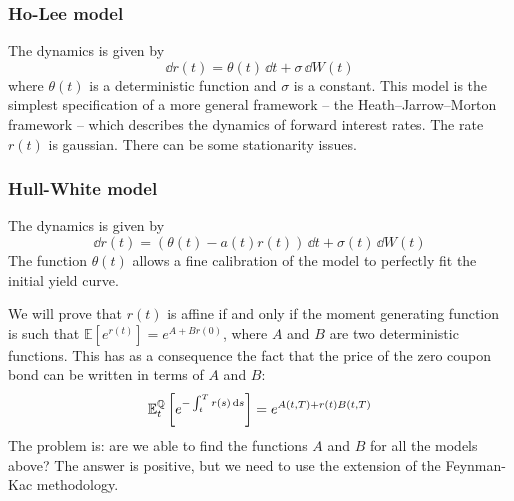 \subsubsection{Ho-Lee model}
The dynamics is given by
\begin{equation}
    \dd r(t) = \theta(t)\,\dd t + \sigma\,\dd W(t)
\end{equation}
where $\theta(t)$ is a deterministic function and $\sigma$ is a constant. This model is the simplest specification of a more general framework -- the Heath–Jarrow–Morton framework -- which describes the dynamics of forward interest rates. The rate $r(t)$ is gaussian. There can be some stationarity issues.

\subsubsection{Hull-White model}
The dynamics is given by
\begin{equation}
    \dd r(t) = (\theta(t)-a(t)r(t))\,\dd t + \sigma(t)\,\dd W(t)
\end{equation}
The function $\theta(t)$ allows a fine calibration of the model to perfectly fit the initial yield curve.
\begin{remark}
    We will prove that $r(t)$ is affine if and only if the moment generating function is such that $\mathbb{E}[e^{r(t)}] = e^{A+Br(0)}$, where $A$ and $B$ are two deterministic functions. This has as a consequence the fact that the price of the zero coupon bond can be written in terms of $A$ and $B$:
    \begin{equation*}
        \mathbb{E}^{\mathbb{Q}}_t\left[e^{-\int_t^T r(s)\,\dd s}\right] = e^{A(t,T)+r(t)B(t,T)}
    \end{equation*}
    The problem is: are we able to find the functions $A$ and $B$ for all the models above? The answer is positive, but we need to use the extension of the Feynman-Kac methodology.
\end{remark}
